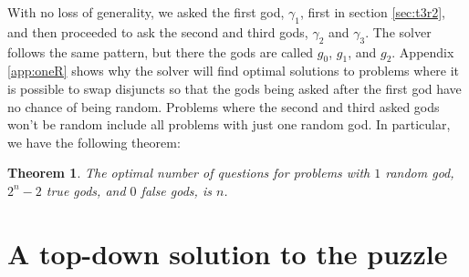 \documentclass[twoside,twocolumn,a4paper,11pt]{article}
\newtheorem{theorem}{Theorem}[section]
\theoremstyle{definition}
\begin{document}
%
\fi


With no loss of generality, we asked the first god, $\gamma_1$, first in section \ref{sec:t3r2},
and then proceeded to ask the second and third gods, $\gamma_2$ and $\gamma_3$. The solver follows the same
pattern, but there the gods are called $g_0$, $g_1$, and $g_2$.
Appendix \ref{app:oneR} shows why the solver will find optimal solutions to problems where
it is possible to swap disjuncts so that the gods
being asked after the first god have no chance of being random. 
Problems where the second and third asked gods won't be random include 
all problems with just one random god. In particular, we have the following theorem:
\begin{theorem}
\label{theorem:oneR}
The optimal number of questions for problems with $1$ random god, $2^n-2$ true gods, 
and $0$ false gods, is $n$.
\end{theorem}
\vspace{-0.25em}



\vspace{-0pt}
\section{A top-down solution to the puzzle}
\end{document}
